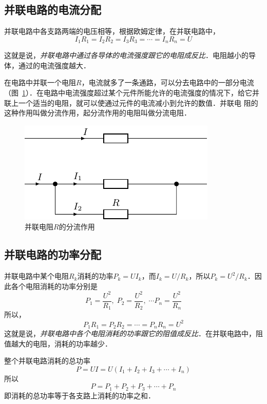 \subsection{并联电路的电流分配}
并联电路中各支路两端的电压相等，根据欧姆定律，在并联电路中，
\[I_1R_1=I_2R_2=I_3R_3=\cdots=I_nR_n=U \]

这就是说，\textit{并联电路中通过各导体的电流强度跟它的电阻成反比}．电阻越小的导体，通过的电流强度越大．

在电路中并联一个电阻$R$，电流就多了一条通路，可以分去电路中的一部分电流（图~\ref{fig_B_7-12}）．在电路中电流强度超过某个元件所能允许的电流强度的情况下，给它并联上一个适当的电阻，就可以使通过元件的电流减小到允许的数值．并联电
阻的这种作用叫做分流作用，起分流作用的电阻叫做分流电阻．
\begin{figure}[htbp]
    \centering
    \includegraphics{fig/B/7-12.pdf}
    \caption{并联电阻$R$的分流作用}\label{fig_B_7-12}
\end{figure}

\subsection{并联电路的功率分配}
并联电路中某个电阻$R_k$消耗的功率$P_k=UI_k$，而$I_k=U/R_k$，所以$P_k=U^2/R_k$．因此各个电阻消耗的功率分别是
\[ P_1=\frac{U^2}{R_1},\;  P_2=\frac{U^2}{R_2},\; \cdots  P_n=\frac{U^2}{R_n} \]
所以，
\[P_1R_1=P_2R_2=\cdots=P_nR_n=U^2 \]
这就是说，\textit{并联电路中各个电阻消耗的功率跟它的阻值成反比}．在并联电路中，阻值越大的电阻，消耗的功率越少．

整个并联电路消耗的总功率
\[P=UI=U (I_1+I_2+I_3+\cdots+I_n) \]
所以
\[P=P_1+P_2+P_3+\cdots+P_n\]
即消耗的总功率等于各支路上消耗的功率之和．

